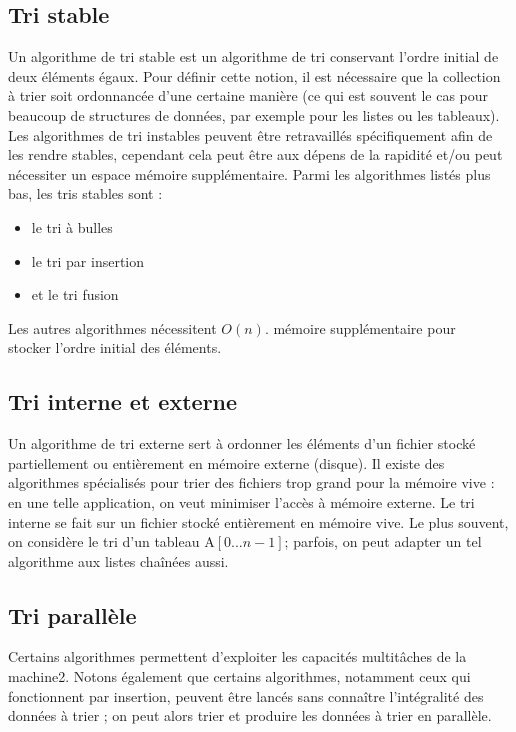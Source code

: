 \documentclass[11pt,a4paper]{article}
\begin{document}
\subsection{Tri stable}
Un algorithme de tri stable est un algorithme de tri conservant l'ordre initial de deux éléments égaux. Pour définir cette notion, il est nécessaire
que la collection à trier soit ordonnancée d'une certaine manière (ce qui est souvent le cas pour beaucoup de structures de données, par exemple pour
les listes ou les tableaux). Les algorithmes de tri instables peuvent être retravaillés spécifiquement afin de les rendre stables, cependant cela peut
être aux dépens de la rapidité et/ou peut nécessiter un espace mémoire supplémentaire. Parmi les algorithmes listés plus bas, les tris stables sont :
\begin{itemize}
    \item le tri à bulles
    \item le tri par insertion
    \item et le tri fusion
\end{itemize}
Les autres algorithmes nécessitent $\displaystyle{O(n)}$. mémoire supplémentaire pour\\stocker l'ordre initial des éléments.

\subsection{Tri interne et externe}
Un algorithme de tri externe sert à ordonner les éléments d’un fichier stocké partiellement ou entièrement en mémoire externe
(disque). Il existe des algorithmes spécialisés pour trier des fichiers trop grand
pour la mémoire vive : en une telle application, on veut minimiser l’accès à
mémoire externe. Le tri interne se fait sur un fichier stocké entièrement en
mémoire vive. Le plus souvent, on considère le tri d’un tableau  A$\left[ 0...n-1 \right]$;
parfois, on peut adapter un tel algorithme aux listes chaînées aussi.

\newpage

\subsection{Tri parallèle}
Certains algorithmes permettent d'exploiter les capacités multitâches de la machine2. Notons également que certains algorithmes, notamment ceux qui fonctionnent
par insertion, peuvent être lancés sans connaître l'intégralité des données à trier ; on peut alors trier et produire les données à trier en parallèle.
\end{document}
